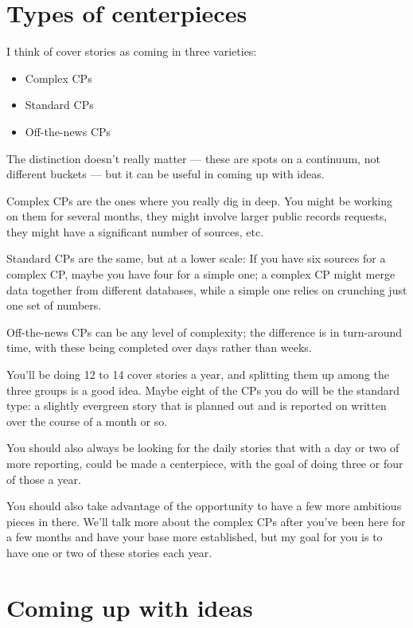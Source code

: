 \documentclass[
  12pt,
  american,
  letterpaperpaper,
  extrafontsizes,onecolumn,openright
  ]{memoir}
\providecommand{\tightlist}{%
  \setlength{\itemsep}{0pt}\setlength{\parskip}{0pt}}
\begin{document}
\hypertarget{types-of-centerpieces}{%
\section*{Types of centerpieces}\label{types-of-centerpieces}}

I think of cover stories as coming in three varieties:

\begin{itemize}
\tightlist
\item
  Complex CPs
\item
  Standard CPs
\item
  Off-the-news CPs
\end{itemize}

The distinction doesn't really matter --- these are spots on a continuum, not different buckets --- but it can be useful in coming up with ideas.

Complex CPs are the ones where you really dig in deep. You might be working on them for several months, they might involve larger public records requests, they might have a significant number of sources, etc.

Standard CPs are the same, but at a lower scale: If you have six sources for a complex CP, maybe you have four for a simple one; a complex CP might merge data together from different databases, while a simple one relies on crunching just one set of numbers.

Off-the-news CPs can be any level of complexity; the difference is in turn-around time, with these being completed over days rather than weeks.

You'll be doing 12 to 14 cover stories a year, and splitting them up among the three groups is a good idea. Maybe eight of the CPs you do will be the standard type: a slightly evergreen story that is planned out and is reported on written over the course of a month or so.

You should also always be looking for the daily stories that with a day or two of more reporting, could be made a centerpiece, with the goal of doing three or four of those a year.

You should also take advantage of the opportunity to have a few more ambitious pieces in there. We'll talk more about the complex CPs after you've been here for a few months and have your base more established, but my goal for you is to have one or two of these stories each year.

\hypertarget{coming-up-with-ideas}{%
\section*{Coming up with ideas}\label{coming-up-with-ideas}}
\end{document}
